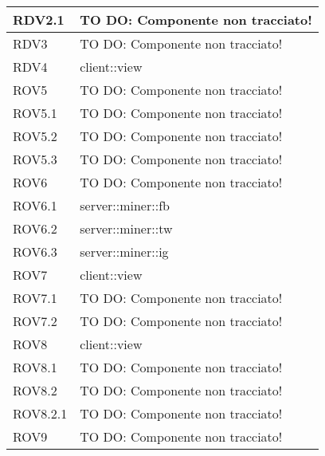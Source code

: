 \begin{center}
\begin{longtable}{| p{4cm} | p{8cm} |}
\hline
RDV2.1 & TO DO: Componente non tracciato! \\
\hline
RDV3 & TO DO: Componente non tracciato! \\
\hline
RDV4 & client::view \\
\hline
ROV5 & TO DO: Componente non tracciato! \\
\hline
ROV5.1 & TO DO: Componente non tracciato! \\
\hline
ROV5.2 & TO DO: Componente non tracciato! \\
\hline
ROV5.3 & TO DO: Componente non tracciato! \\
\hline
ROV6 & TO DO: Componente non tracciato! \\
\hline
ROV6.1 & server::miner::fb \\
\hline
ROV6.2 & server::miner::tw \\
\hline
ROV6.3 & server::miner::ig \\
\hline
ROV7 & client::view \\
\hline
ROV7.1 & TO DO: Componente non tracciato! \\
\hline
ROV7.2 & TO DO: Componente non tracciato! \\
\hline
ROV8 & client::view \\
\hline
ROV8.1 & TO DO: Componente non tracciato! \\
\hline
ROV8.2 & TO DO: Componente non tracciato! \\
\hline
ROV8.2.1 & TO DO: Componente non tracciato! \\
\hline
ROV9 & TO DO: Componente non tracciato! \\
\hline
\end{longtable}
\egroup
\end{center}
